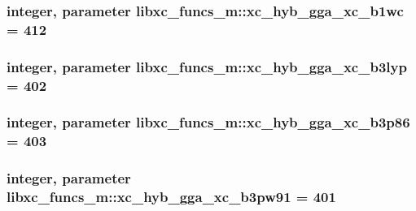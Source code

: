\hypertarget{classlibxc__funcs__m_a1dd2a5b591895ca31ce079e23c543ceb}{
\subsubsection[{xc\-\_\-hyb\-\_\-gga\-\_\-xc\-\_\-b1wc}]{\setlength{\rightskip}{0pt plus 5cm}integer, parameter libxc\-\_\-funcs\-\_\-m\-::xc\-\_\-hyb\-\_\-gga\-\_\-xc\-\_\-b1wc = 412}}\label{classlibxc__funcs__m_a1dd2a5b591895ca31ce079e23c543ceb}
\hypertarget{classlibxc__funcs__m_af66d5abbc9b49686300615eb6cff2cf3}{
\subsubsection[{xc\-\_\-hyb\-\_\-gga\-\_\-xc\-\_\-b3lyp}]{\setlength{\rightskip}{0pt plus 5cm}integer, parameter libxc\-\_\-funcs\-\_\-m\-::xc\-\_\-hyb\-\_\-gga\-\_\-xc\-\_\-b3lyp = 402}}\label{classlibxc__funcs__m_af66d5abbc9b49686300615eb6cff2cf3}
\hypertarget{classlibxc__funcs__m_ade5bcc9b5cc0b1eb4742ccb340b2c521}{
\subsubsection[{xc\-\_\-hyb\-\_\-gga\-\_\-xc\-\_\-b3p86}]{\setlength{\rightskip}{0pt plus 5cm}integer, parameter libxc\-\_\-funcs\-\_\-m\-::xc\-\_\-hyb\-\_\-gga\-\_\-xc\-\_\-b3p86 = 403}}\label{classlibxc__funcs__m_ade5bcc9b5cc0b1eb4742ccb340b2c521}
\hypertarget{classlibxc__funcs__m_acf88ed58efb151c02df9b04122339392}{
\subsubsection[{xc\-\_\-hyb\-\_\-gga\-\_\-xc\-\_\-b3pw91}]{\setlength{\rightskip}{0pt plus 5cm}integer, parameter libxc\-\_\-funcs\-\_\-m\-::xc\-\_\-hyb\-\_\-gga\-\_\-xc\-\_\-b3pw91 = 401}}\label{classlibxc__funcs__m_acf88ed58efb151c02df9b04122339392}
